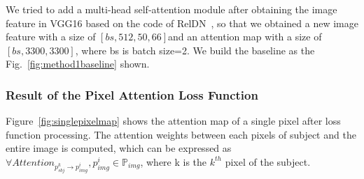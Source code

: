 We tried to add a multi-head self-attention module after obtaining the image feature in VGG16 based on the code of RelDN~\cite{zhang2019graphical},  so that we obtained a new image feature with a size of $ [bs, 512, 50, 66]  $and an  attention map with a size of $ [bs, 3300, 3300] $, where bs is batch size=2. We build the baseline as the Fig.~\ref{fig:method1baseline} shown.

\subsubsection{Result of the Pixel Attention Loss  Function}
Figure~\ref{fig:singlepixelmap} shows the attention map of a single pixel after loss function processing. The attention weights between each pixels of subject and the entire image is computed, which can be expressed as $ \forall Attention_{p^k_{sbj} \to p^i_{img}} , p^i_{img} \in \mathbb{P}_{img} $, where k is the $ k^{th} $ pixel of the subject.

